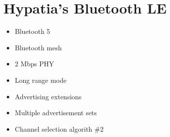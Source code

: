 %
%
%



\chapter{Hypatia's Bluetooth LE}

\begin{itemize}
    \item Bluetooth 5
    \item Bluetooth mesh
    \item 2 Mbps PHY
    \item Long range mode
    \item Advertising extensions
    \item Multiple advertisement sets
    \item Channel selection algorith \#2
\end{itemize}
